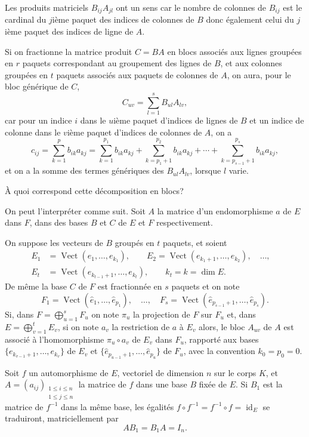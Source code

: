 Les produits matriciels $B_{ij}A_{jl}$ ont un sens car le nombre de colonnes de $B_{ij}$ est le cardinal du $j$ième paquet des indices de colonnes de $B$ donc également celui du $j$ième paquet des indices de ligne de $A$.

Si on fractionne la matrice produit $C=BA$ en blocs associés aux lignes groupées en $r$ paquets correspondant au groupement des lignes de $B$, et aux colonnes groupées en $t$ paquets associés aux paquets de colonnes de $A$, on aura, pour le bloc générique de $C$,
\[
C_{uv}=\sum_{l=1}^s B_{ul}A_{lv},
\]
car pour un indice $i$ dans le $u$ième paquet d'indices de lignes de $B$ et un indice de colonne dans le $v$ième paquet d'indices de colonnes de $A$, on a
\[
c_{ij}=\sum_{k=1}^p b_{ik}a_{kj}
=\sum_{k=1}^{p_1}b_{ik}a_{kj}+\sum_{k=p_1+1}^{p_2}b_{ik}a_{kj}+\cdots+\sum_{k=p_{s-1}+1}^{p_s}b_{ik}a_{kj},
\]
et on a la somme des termes génériques des $B_{ul}A_{lv}$, lorsque $l$ varie.

À quoi correspond cette décomposition en blocs?

On peut l'interpréter comme suit. Soit $A$ la matrice d'un endomorphisme $a$ de $E$ dans $F$, dans des bases $B$ et $C$ de $E$ et $F$ respectivement.

On suppose les vecteurs de $B$ groupés en $t$ paquets, et soient
\[
\begin{aligned}
E_1&=\operatorname{Vect}(e_1,\ldots,e_{k_1}),\qquad
E_2=\operatorname{Vect}(e_{k_1+1},\ldots,e_{k_2}),\quad\ldots,\quad\\
E_t&=\operatorname{Vect}(e_{k_{t-1}+1},\ldots,e_{k_t}),\qquad k_t=k=\dim E.
\end{aligned}
\]
De même la base $C$ de $F$ est fractionnée en $s$ paquets et on note
\[
F_1=\operatorname{Vect}(\hat e_1,\ldots,\hat e_{p_1}),\quad\ldots,\quad
F_s=\operatorname{Vect}(\hat e_{p_{s-1}+1},\ldots,\hat e_{p_s}).
\]
Si, dans $F=\bigoplus_{u=1}^sF_u$ on note $\pi_u$ la projection de $F$ sur $F_u$ et, dans $E=\bigoplus_{v=1}^tE_v$, si on note $a_v$ la restriction de $a$ à $E_v$ alors, le bloc $A_{uv}$ de $A$ est associé à l'homomorphisme $\pi_u\circ a_v$ de $E_v$ dans $F_u$, rapporté aux bases $\{e_{k_{v-1}+1},\ldots,e_{k_v}\}$ de $E_v$ et $\{\hat e_{p_{u-1}+1},\ldots,\hat e_{p_u}\}$ de $F_u$, avec la convention $k_0=p_0=0$.


Soit $f$ un automorphisme de $E$, vectoriel de dimension $n$ sur le corps $K$, et $A=(a_{ij})_{\substack{1\le i\le n\\1\le j\le n}}$ la matrice de $f$ dans une base $B$ fixée de $E$. Si $B_1$ est la matrice de $f^{-1}$ dans la même base, les égalités $f\circ f^{-1}=f^{-1}\circ f=\operatorname{id}_E$ se traduiront, matriciellement par
\[
AB_1=B_1A=I_n.
\]

